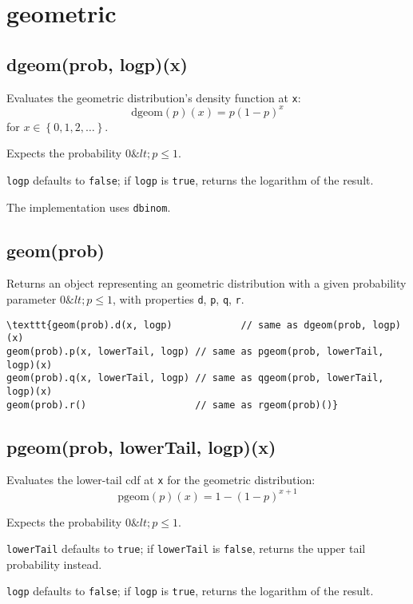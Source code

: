 \documentclass{article}
\begin{document}
  \section{geometric}
    \subsection*{dgeom(prob, logp)(x)}
    Evaluates the geometric distribution's density function at \texttt{x}:
$$\textrm{dgeom}(p)(x) = p(1-p)^x$$
for $x \in\left\{0,1,2,\ldots\right\}$.


Expects the probability $0 \&lt; p\leq 1$.


\texttt{logp} defaults to \texttt{false}; if \texttt{logp} is \texttt{true}, returns the
logarithm of the result.


The implementation uses \texttt{dbinom}.


    \subsection*{geom(prob)}
    Returns an object representing an geometric distribution with a
given probability parameter $0 \&lt; p \leq 1$,
with properties \texttt{d}, \texttt{p}, \texttt{q}, \texttt{r}.


\begin{lstlisting}
\texttt{geom(prob).d(x, logp)            // same as dgeom(prob, logp)(x)
geom(prob).p(x, lowerTail, logp) // same as pgeom(prob, lowerTail, logp)(x)
geom(prob).q(x, lowerTail, logp) // same as qgeom(prob, lowerTail, logp)(x)
geom(prob).r()                   // same as rgeom(prob)()}\end{lstlisting}

    \subsection*{pgeom(prob, lowerTail, logp)(x)}
    Evaluates the lower-tail cdf at \texttt{x} for the geometric distribution:
$$\textrm{pgeom}(p)(x) = 1 - (1-p)^{x+1}$$


Expects the probability $0 \&lt; p \leq 1$.


\texttt{lowerTail} defaults to \texttt{true}; if \texttt{lowerTail} is \texttt{false}, returns
the upper tail probability instead.


\texttt{logp} defaults to \texttt{false}; if \texttt{logp} is \texttt{true}, returns the logarithm
of the result.
\end{document}
